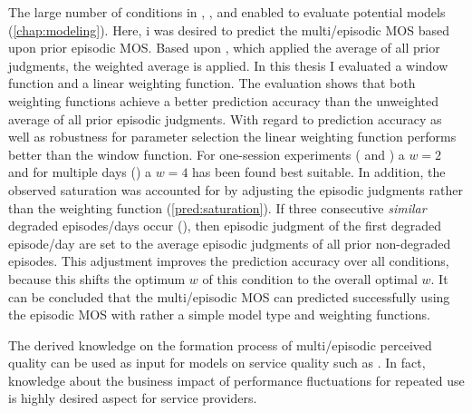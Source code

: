 The large number of conditions in , \EIIa{}, and  enabled to evaluate potential models (\autoref{chap:modeling}).
Here, i was desired to predict the multi\-/episodic \ac{MOS} based upon prior episodic \ac{MOS}.
Based upon \cite{moller_single-call_2011}, which applied the average of all prior judgments, the weighted average is applied.
In this thesis I evaluated a window function and a linear weighting function.
The evaluation shows that both weighting functions achieve a better prediction accuracy than the unweighted average of all prior episodic judgments.
With regard to prediction accuracy as well as robustness for parameter selection the linear weighting function performs better than the window function.
For one-session experiments ( and \EIIa{}) a $\mathit{w}=2$ and for multiple days () a $\mathit{w}=4$ has been found best suitable.
In addition, the observed saturation was accounted for by adjusting the episodic judgments rather than the weighting function (\autoref{pred:saturation}).
If three consecutive \emph{similar} degraded episodes/days occur (), then episodic judgment of the first degraded episode/day are set to the average episodic judgments of all prior non-degraded episodes.
This adjustment improves the prediction accuracy over all conditions, because this shifts the optimum $\mathit{w}$ of this condition to the overall optimal $\mathit{w}$.
It can be concluded that the multi\-/episodic \ac{MOS} can predicted successfully using the episodic \ac{MOS} with rather a simple model type and weighting functions.

The derived knowledge on the formation process of multi\-/episodic perceived quality can be used as input for models on service quality such as \citet{parasuraman_conceptual_1985}.
In fact, knowledge about the business impact of performance fluctuations for repeated use is highly desired aspect for service providers.

